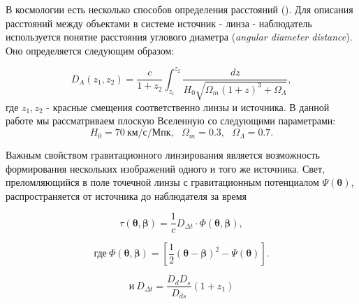 В космологии есть несколько способов определения расстояний (\cite{distance_measures}). Для описания расстояний между объектами в системе источник - линза - наблюдатель используется понятие расстояния углового диаметра (\textit{angular diameter distance}). Оно определяется следующим образом:

\begin{equation}\label{eq:ang_dia_dist}
D_{A}\left(z_{1}, z_{2}\right)=\frac{c}{1+z_{2}} \int_{z_{1}}^{z_{2}} \frac{d z}{H_{0} \sqrt{\Omega_{m}\left(1+z\right)^{3}+\Omega_{\Lambda}}},
\end{equation}
где $z_1, z_2$ - красные смещения  соответственно линзы и источника. В данной работе мы рассматриваем плоскую Вселенную со следующими параметрами: $$H_0=70 \ \textrm{км/с/Мпк}, \ \ \ \Omega_m=0.3, \ \ \ \Omega_\Lambda=0.7.$$


Важным свойством гравитационного линзирования является возможность формирования нескольких изображений одного и того же источника. Свет, преломляющийся в поле точечной линзы с гравитационным потенциалом $\Psi(\boldsymbol{\theta})$, распространяется от источника до наблюдателя за время

\begin{equation}\label{eq:tau}
\tau(\boldsymbol{\theta}, \boldsymbol{\beta})=\frac{1}{c} D_{\Delta t} \cdot \Phi(\boldsymbol{\theta},\boldsymbol{\beta}),
\end{equation}

\begin{equation}\label{eq:fi}
\textrm{где} \ \Phi(\boldsymbol{\theta},\boldsymbol{\beta}) =  \left[\frac{1}{2}(\boldsymbol{\theta}-\boldsymbol{\beta})^{2}-\Psi(\boldsymbol{\theta})\right].
\end{equation}

\begin{equation}\label{eq:dDt}
\textrm{и} \ D_{\Delta t} = \frac{D_{d} D_{s}}{D_{d s}} (1+z_1) 
\end{equation}


